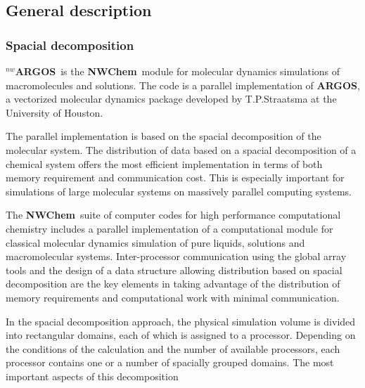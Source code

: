 \newcommand{\mc}[3]{\multicolumn{#1}{#2}{#3}}
\newcommand{\vb}[1]{\mbox{\verb.#1.}}
\newcommand{\none}{\multicolumn{2}{|c|}{ }}
\renewcommand{\thetable}{\Roman{table}}
\newcommand{\mcc}[1]{\multicolumn{2}{c}{#1}}
\def\bmu{\mbox{\boldmath $\mu$}}
\def\bE{\mbox{\bf E}}
\def\br{\mbox{\bf r}}
\def\tT{\tilde{T}}
\def\t{\tilde{1}}
\def\ip{i\prime}
\def\jp{j\prime}
\def\ipp{i\prime\prime}
\def\jpp{j\prime\prime}
\def\etal{{\sl et al.}}
\def\nwchem{{\bf NWChem}}
\def\nwargos{{\bf $^{nw}$ARGOS}}
\def\nwtop{{\bf $^{nw}$TOP}}
\def\nwrst{{\bf $^{nw}$RST}}
\def\nwsgm{{\bf $^{nw}$SGM}}
\def\argos{{\bf ARGOS}}
\subsection{General description}
\subsubsection{Spacial decomposition}
\nwargos\  is the \nwchem\  module for molecular dynamics
simulations of macromolecules and solutions. The code is a parallel
implementation of \argos, a vectorized molecular dynamics
package developed by T.P.Straatsma at the University of Houston.
\par
The parallel implementation is based on the spacial decomposition of 
the molecular system.
The distribution of data based on a spacial decomposition of a
chemical system offers the most
efficient implementation in terms of both memory requirement and
communication cost. This is especially important for simulations
of large molecular systems on massively parallel computing systems.
\par
The \nwchem\  suite of computer codes for high performance computational 
chemistry includes a parallel implementation of a computational
module for classical molecular dynamics simulation of pure liquids,
solutions and macromolecular systems.
Inter-processor communication using the global array tools and the
design of a data structure allowing distribution based on spacial
decomposition are the key elements in taking advantage of
the distribution of memory requirements and computational work with
minimal communication.
\par
In the spacial decomposition approach, the physical simulation
volume is divided into rectangular domains, each of which is
assigned to a processor.
Depending on the conditions of the calculation and the
number of available processors, each processor contains one or a
number of spacially grouped domains.
The most important aspects of this decomposition
